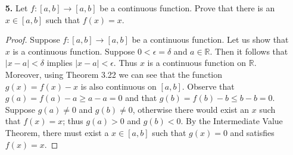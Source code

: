 \documentclass[ 12pt ]{article}
\begin{document}
\begin{enumerate}
\begin{proof}
		Let us show that $x^2$ is continuous on $[-1, 0]$. Suppose $\epsilon > 0$ and $x, a \in [-1, 0]$. Let $\delta = \frac{\epsilon}{2}$. Observe that $|x + a| \leq
		|x| + |a| \leq 2$. Then $|x - a| < \delta$ implies $|x^2 - a^2| = |x - a||x + a| \leq 2|x - a| < 2\delta = \epsilon$. Thus $|x^2 - a^2| < \epsilon$ by transitivity.
		By definition $x^2$ is continuous on $[-1, 0]$. \\

		By Theorem 3.22, $f$ is continuous on $[-1, 0]$. Observe that $f(-1) < 0$ and $f(0) > 0$. Thus by the Intermediate Value Theorem, there exists an $x \in [-1,0]$
		such that $f(x) = 0$ and satifies $e^x = x^2$.
	\end{proof}


	\item[\textbf{5.}] Let $f: [a,b] \rightarrow [a,b]$ be a continuous function. Prove that there is an $x \in [a,b]$ such that $f(x) = x$.

	\begin{proof}
		Suppose $f: [a,b] \rightarrow [a,b]$ be a continuous function. Let us show that $x$ is a continuous function. Suppose $0 < \epsilon = \delta$ and $a \in \mathbb{R}$.
		Then it follows that $|x - a| < \delta$ implies $|x - a| < \epsilon$. Thus $x$ is a continuous function on $\mathbb{R}$. Moreover, using Theorem 3.22 we can see that
		the function $g(x) = f(x) - x$ is also continuous on $[a, b]$. Observe that $g(a) = f(a) - a \geq a - a = 0$ and that $g(b) = f(b) - b \leq b - b = 0$. Suppose
		$g(a) \neq 0$ and $g(b) \neq 0$, otherwise there would exist an $x$ such that $f(x) = x$; thus $g(a) > 0$ and $g(b) < 0$. By the Intermediate Value Theorem, there
		must exist a $x \in [a, b]$ such that $g(x) = 0$ and satisfies $f(x) = x$.
	\end{proof}

\end{enumerate}
\end{document}
